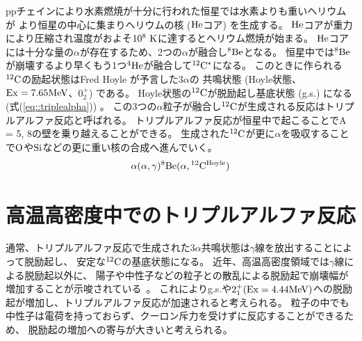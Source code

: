 ppチェインにより水素燃焼が十分に行われた恒星では水素よりも重いヘリウムが
より恒星の中心に集まりヘリウムの核 ($\rm{He}$コア) を生成する。
$\rm{He}$コアが重力により圧縮され温度がおよそ$10^8~\rm{K}$に達するとヘリウム燃焼が始まる。
$\rm{He}$コアには十分な量の$\alpha$が存在するため、2つの$\alpha$が融合し${}^{8}\rm{Be}$となる。
恒星中では${}^{8}\rm{Be}$が崩壊するより早くもう1つ${}^{4}\rm{He}$が融合して${}^{12}\rm{C}^{*}$になる。
このときに作られる${}^{12}\rm{C}$の励起状態はFred Hoyle が予言した$3\alpha$の
共鳴状態 (Hoyle状態、$\rm{Ex} = 7.65\rm{MeV}$、$0_{2}^{+}$) である。
Hoyle状態の${}^{12}\rm{C}$が脱励起し基底状態 (g.s.) になる (式(\ref{eq::triplealpha})) 。
この3つの$\alpha$粒子が融合し${}^{12}\rm{C}$が生成される反応はトリプルアルファ反応と呼ばれる。
トリプルアルファ反応が恒星中で起こることでA = 5, 8の壁を乗り越えることができる。
生成された${}^{12}\rm{C}$が更に$\alpha$を吸収することで$\rm{O}$や$\rm{Si}$などの更に重い核の合成へ進んでいく。
\begin{equation}
  \alpha(\alpha,\gamma){}^{8}\rm{Be}(\alpha,{}^{12}\rm{C}^{Hoyle})\label{eq::triplealpha}
\end{equation}

\section{高温高密度中でのトリプルアルファ反応}
\label{seq::triplealphareaction}
通常、トリプルアルファ反応で生成された$3\alpha$共鳴状態は$\gamma$線を放出することによって脱励起し、
安定な${}^{12}\rm{C}$の基底状態になる。
近年、高温高密度領域では$\gamma$線による脱励起以外に、
陽子や中性子などの粒子との散乱による脱励起で崩壊幅が増加することが示唆されている~\cite{hotdensemedium}。
これによりg.s.や$2_{1}^{+} (\rm{Ex} = 4.44 \rm{MeV}) $への脱励起が増加し、トリプルアルファ反応が加速されると考えられる。
粒子の中でも中性子は電荷を持っておらず、クーロン斥力を受けずに反応することができるため、
脱励起の増加への寄与が大きいと考えられる。

